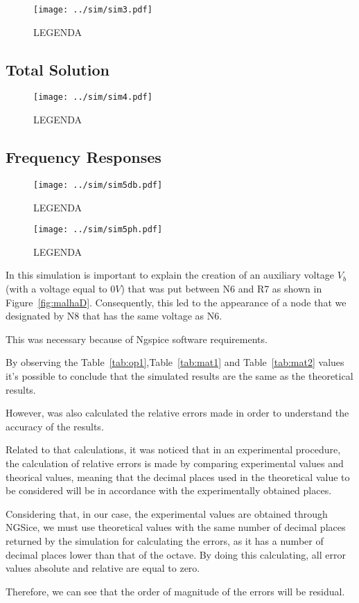 \begin{figure}[H] \centering
\texttt{[image: ../sim/sim3.pdf]}
\caption{LEGENDA} %
\label{fig:sim3}
\end{figure}

\subsection{Total Solution}

\begin{figure}[H] \centering
\texttt{[image: ../sim/sim4.pdf]}
\caption{LEGENDA} %
\label{fig:sim4}
\end{figure}

\subsection{Frequency Responses}

\begin{figure}[H] \centering
\texttt{[image: ../sim/sim5db.pdf]}
\caption{LEGENDA} %
\label{fig:sim5db}
\end{figure}

\begin{figure}[H] \centering
\texttt{[image: ../sim/sim5ph.pdf]}
\caption{LEGENDA} %
\label{fig:sim5ph}
\end{figure}

In this simulation is important to explain the creation of an auxiliary voltage $V_b$ (with a voltage equal to $0V$) that was put between N6 and R7 as shown in Figure~\ref{fig:malhaD}. Consequently, this led to the appearance of a node that we designated by N8 that has the same voltage as N6.

This was necessary because of Ngspice software requirements.

By observing the Table~\ref{tab:op1},Table~\ref{tab:mat1} and Table~\ref{tab:mat2} values it's possible to conclude that the simulated results are the same as the theoretical results.%


However, was also calculated the relative errors made in order to understand the accuracy of the results. 

Related to that calculations, it was noticed that in an experimental procedure, the calculation of relative errors is made by comparing experimental values and theorical values, meaning that the decimal places used in the theoretical value to be considered will be in accordance with the experimentally obtained places.


Considering that, in our case, the experimental values are obtained through NGSice, we must use theoretical values with the same number of decimal places returned by the simulation for calculating the errors, as it has a number of decimal places lower than that of the octave. By doing this calculating, all error values absolute and relative are equal to zero. 

Therefore, we can see that the order of magnitude of the errors will be residual.




